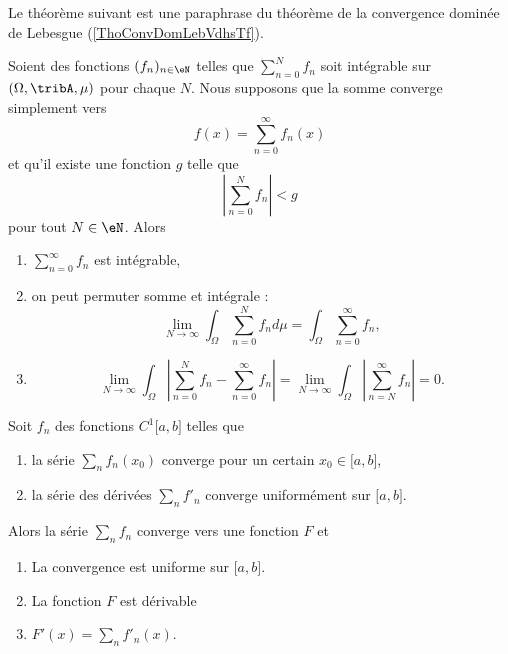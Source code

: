 Le théorème suivant est une paraphrase du théorème de la convergence dominée de Lebesgue (\ref{ThoConvDomLebVdhsTf}).
\begin{theorem}     \label{ThoockMHn}
    Soient des fonctions \( (f_n)_{n\in \eN}\) telles que \( \sum_{n=0}^Nf_n\) soit intégrable sur \( (\Omega,\tribA,\mu)\) pour chaque \( N\). Nous supposons que la somme converge simplement vers
    \begin{equation}
        f(x)=\sum_{n=0}^{\infty}f_n(x)
    \end{equation}
    et qu'il existe une fonction \( g\) telle que
    \begin{equation}
        \left| \sum_{n=0}^Nf_n \right| <g
    \end{equation}
    pour tout \( N\in \eN\). Alors
    \begin{enumerate}
        \item
            \( \sum_{n=0}^{\infty}f_n\) est intégrable,
        \item
            on peut permuter somme et intégrale :
            \begin{equation}
                \lim_{N\to \infty} \int_{\Omega}\sum_{n=0}^Nf_nd\mu=\int_{\Omega}\sum_{n=0}^{\infty}f_n,
            \end{equation}
        \item
            \begin{equation}
                \lim_{N\to \infty} \int_{\Omega}\left| \sum_{n=0}^Nf_n-\sum_{n=0}^{\infty}f_n \right| =\lim_{N\to \infty} \int_{\Omega}\left| \sum_{n=N}^{\infty}f_n \right| =0.
            \end{equation}
    \end{enumerate}
\end{theorem}


\begin{theorem} \label{ThoCSGaPY}
    Soit \( f_n\) des fonctions \( C^1\mathopen[ a , b \mathclose]\) telles que
    \begin{enumerate}
        \item
            la série \( \sum_n f_n(x_0)\) converge pour un certain \( x_0\in\mathopen[ a , b \mathclose]\),
        \item
            la série des dérivées \( \sum_n f'_n\) converge uniformément sur \( \mathopen[ a , b \mathclose]\).
    \end{enumerate}
    Alors la série \( \sum_n f_n\) converge vers une fonction \( F\) et
    \begin{enumerate}
        \item
            La convergence est uniforme sur \( \mathopen[ a , b \mathclose]\).
        \item
            La fonction \( F\) est dérivable
        \item
            \( F'(x)=\sum_nf'_n(x)\).
    \end{enumerate}
\end{theorem}

